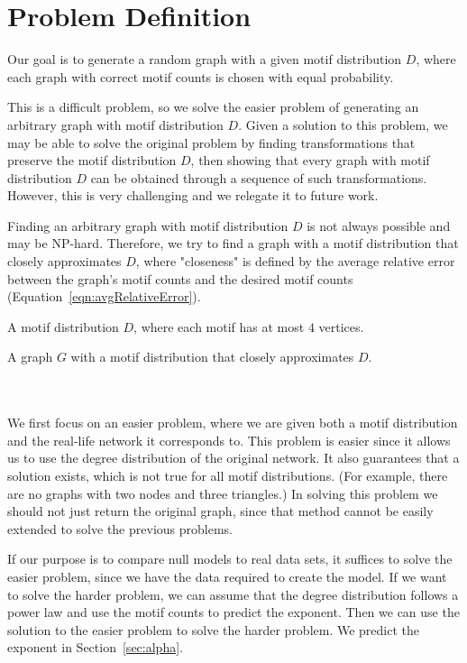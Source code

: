 \section{Problem Definition}
\label{sec:problem}
Our goal is to generate a random graph with a given motif distribution $D$,
where each graph with correct motif counts is chosen with equal probability.

This is a difficult problem, so we solve the easier problem of generating
an arbitrary graph with motif distribution $D$.  Given a solution to this
problem, we may be able to solve the original problem by finding 
transformations that preserve the motif distribution $D$, then showing
that every graph with motif distribution $D$ can be obtained through a
sequence of such transformations.  However, this is very challenging and we
relegate it to future work.

Finding an arbitrary graph with motif distribution $D$ is not always
possible and may be NP-hard.  Therefore, we try to find a graph with a
motif distribution that closely approximates $D$, where "closeness" is
defined by the average relative error between the graph's motif counts and
the desired motif counts (Equation~\ref{eqn:avgRelativeError}).

\begin{framed}
 A motif distribution $D$, where each motif has at most $4$ vertices.

 A graph $G$ with a motif distribution that closely
approximates $D$.
\end{framed}
\\\\
We first focus on an easier problem, where we are given both a motif
distribution and the real-life network it corresponds to.  This problem is
easier since it allows us to use the degree distribution of the original
network.  It also guarantees that a solution exists, which is not true for
all motif distributions.  (For example, there are no graphs with two nodes
and three triangles.)  In solving this problem we should not just return
the original graph, since that method cannot be easily extended to solve
the previous problems.

If our purpose is to compare null models to real data sets, it suffices to
solve the easier problem, since we have the data required to create the
model.  If we want to solve the harder problem, we can assume that the
degree distribution follows a power law and use the motif counts to predict
the exponent.  Then we can use the solution to the easier problem to solve
the harder problem.  We predict the exponent in Section~\ref{sec:alpha}.


